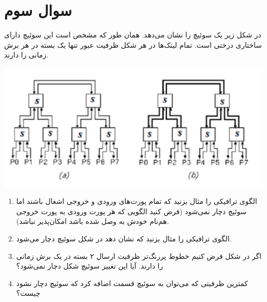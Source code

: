 \section{سوال سوم}

در شکل زیر یک سوئیچ  را نشان می‌دهد. همان طور که مشخص است این سوئیچ دارای ساختاری درختی است. تمام لینک‌ها در هر شکل  ظرفیت عبور تنها یک بسته در هر برش زمانی را دارند.


\begin{center}
	\includegraphics*[width=1\linewidth]{pics/img1.png}
	\label{سوئیچ سوال سوم}
\end{center}


\begin{enumerate}
	\item 
	
	الگوی ترافیکی را مثال بزنید که تمام پورت‌های ورودی و خروجی اشغال باشند اما سوئیچ دچار  نمی‌شود
	(فرض کنید الگویی که هر پورت ورودی به پورت خروجی هم‌نام خودش  به  وصل شده باشد امکان‌پذیر نباشد).
	
	
	\item 
	الگوی ترافیکی را مثال بزنید که نشان دهد در شکل  سوئیچ دچار  می‌شود.
	
	
	\item 
	اگر در شکل  فرض کنیم خطوط پررنگ‌تر ظرفیت ارسال ۲ بسته در یک برش زمانی را دارند. آیا این تغییر سوئیچ شکل  دچار  نمی‌شود؟ 
	
	
	\item 
	کمترین ظرفیتی که می‌توان به سوئیچ قسمت  اضافه کرد که سوئیچ دچار  نشود چیست؟
	
	
\end{enumerate}